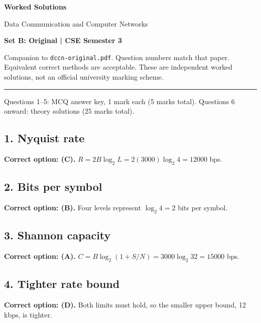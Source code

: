 \documentclass[11pt,a4paper]{article}
\begin{document}
{\LARGE\bfseries Worked Solutions}\par{\large Data Communication and Computer Networks}\par\textbf{Set B: Original | CSE Semester 3}\par
Companion to \texttt{dccn-original.pdf}. Question numbers match that paper. Equivalent correct methods are acceptable. These are independent worked solutions, not an official university marking scheme.\par\medskip\hrule\medskip
Questions 1--5: MCQ answer key, 1 mark each (5 marks total). Questions 6 onward: theory solutions (25 marks total).\par
\noindent\begin{minipage}{\linewidth}\subsection*{1. Nyquist rate}
\textbf{Correct option: (C).} $R=2B\log_2L=2(3000)\log_2 4=12000$ bps.
\end{minipage}\par\medskip
\noindent\begin{minipage}{\linewidth}\subsection*{2. Bits per symbol}
\textbf{Correct option: (B).} Four levels represent $\log_2 4=2$ bits per symbol.
\end{minipage}\par\medskip
\noindent\begin{minipage}{\linewidth}\subsection*{3. Shannon capacity}
\textbf{Correct option: (A).} $C=B\log_2(1+S/N)=3000\log_2 32=15000$ bps.
\end{minipage}\par\medskip
\noindent\begin{minipage}{\linewidth}\subsection*{4. Tighter rate bound}
\textbf{Correct option: (D).} Both limits must hold, so the smaller upper bound, 12 kbps, is tighter.
\end{minipage}\par\medskip
\end{document}
